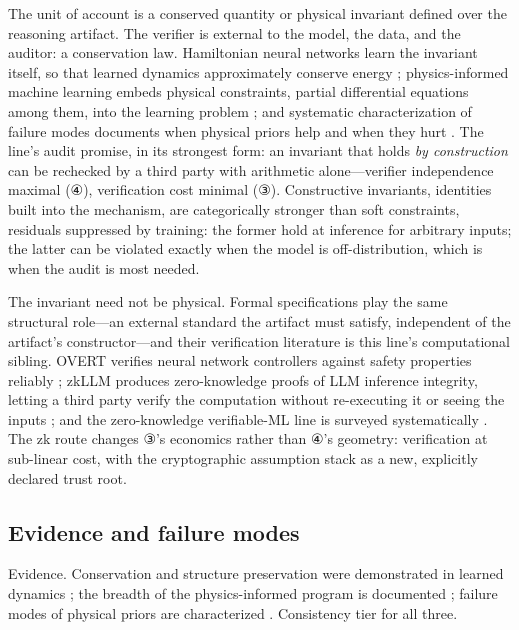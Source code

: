 \documentclass[11pt,a4paper]{article}
\begin{document}
The unit of account is a conserved quantity or physical invariant defined over the reasoning artifact. The verifier is external to the model, the data, and the auditor: a conservation law. Hamiltonian neural networks learn the invariant itself, so that learned dynamics approximately conserve energy \cite{key11}; physics-informed machine learning embeds physical constraints, partial differential equations among them, into the learning problem \cite{key12}; and systematic characterization of failure modes documents when physical priors help and when they hurt \cite{key13}. The line's audit promise, in its strongest form: an invariant that holds \textit{by construction} can be rechecked by a third party with arithmetic alone—verifier independence maximal (④), verification cost minimal (③). Constructive invariants, identities built into the mechanism, are categorically stronger than soft constraints, residuals suppressed by training: the former hold at inference for arbitrary inputs; the latter can be violated exactly when the model is off-distribution, which is when the audit is most needed.

The invariant need not be physical. Formal specifications play the same structural role—an external standard the artifact must satisfy, independent of the artifact's constructor—and their verification literature is this line's computational sibling. OVERT verifies neural network controllers against safety properties reliably \cite{key52}; zkLLM produces zero-knowledge proofs of LLM inference integrity, letting a third party verify the computation without re-executing it or seeing the inputs \cite{key53}; and the zero-knowledge verifiable-ML line is surveyed systematically \cite{key54}. The zk route changes ③'s economics rather than ④'s geometry: verification at sub-linear cost, with the cryptographic assumption stack as a new, explicitly declared trust root.

\subsection{Evidence and failure modes}

Evidence. Conservation and structure preservation were demonstrated in learned dynamics \cite{key11}; the breadth of the physics-informed program is documented \cite{key12}; failure modes of physical priors are characterized \cite{key13}. Consistency tier for all three.
\end{document}
